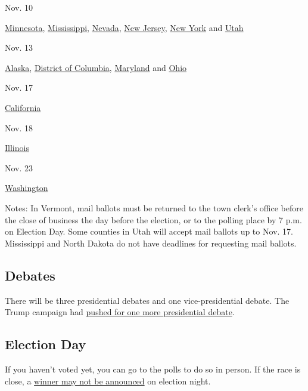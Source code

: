 Nov. 10

\href{https://www.sos.state.mn.us/elections-voting/}{Minnesota},
\href{https://www.sos.ms.gov/Elections-Voting/Pages/default.aspx}{Mississippi},
\href{https://www.nvsos.gov/sos/elections}{Nevada},
\href{https://www.state.nj.us/state/elections/index.shtml}{New Jersey},
\href{https://www.elections.ny.gov/}{New York} and
\href{https://elections.utah.gov/}{Utah}

Nov. 13

\href{https://www.elections.alaska.gov/Core/votingbymail.php}{Alaska},
\href{https://www.dcboe.org/home}{District of Columbia},
\href{https://elections.maryland.gov/}{Maryland} and
\href{https://www.ohiosos.gov/elections/}{Ohio}

Nov. 17

\href{https://www.sos.ca.gov/elections}{California}

Nov. 18

\href{https://www.elections.il.gov/}{Illinois}

Nov. 23

\href{https://www.sos.wa.gov/elections/}{Washington}

Notes: In Vermont, mail ballots must be returned to the town clerk's
office before the close of business the day before the election, or to
the polling place by 7 p.m. on Election Day. Some counties in Utah will
accept mail ballots up to Nov. 17. Mississippi and North Dakota do not
have deadlines for requesting mail ballots.

\hypertarget{debates}{%
\subsection{Debates}\label{debates}}

There will be three presidential debates and one vice-presidential
debate. The Trump campaign had
\href{https://www.nytimes3xbfgragh.onion/2020/06/18/us/politics/trump-presidential-debates-2020.html}{pushed
for one more presidential debate}.

\hypertarget{election-day}{%
\subsection{Election Day}\label{election-day}}

If you haven't voted yet, you can go to the polls to do so in person. If
the race is close, a
\href{https://www.nytimes3xbfgragh.onion/2020/06/24/us/politics/november-2020-election-day-results.html}{winner
may not be announced} on election night.

